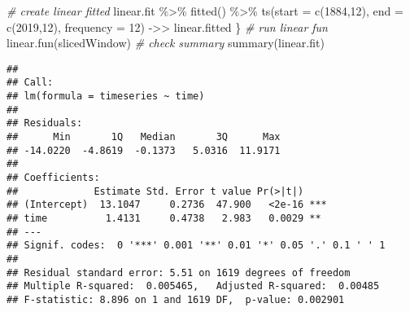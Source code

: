 \documentclass[
]{article}
\newenvironment{Shaded}{\begin{snugshade}}{\end{snugshade}}
\newcommand{\AttributeTok}[1]{\textcolor[rgb]{0.77,0.63,0.00}{#1}}
\newcommand{\CommentTok}[1]{\textcolor[rgb]{0.56,0.35,0.01}{\textit{#1}}}
\newcommand{\DecValTok}[1]{\textcolor[rgb]{0.00,0.00,0.81}{#1}}
\newcommand{\FunctionTok}[1]{\textcolor[rgb]{0.00,0.00,0.00}{#1}}
\newcommand{\NormalTok}[1]{#1}
\newcommand{\OtherTok}[1]{\textcolor[rgb]{0.56,0.35,0.01}{#1}}
\newcommand{\SpecialCharTok}[1]{\textcolor[rgb]{0.00,0.00,0.00}{#1}}
\begin{document}
\begin{Shaded}
\begin{Highlighting}[]
    \CommentTok{\# create linear fitted}
\NormalTok{  linear.fit }\SpecialCharTok{\%\textgreater{}\%} \FunctionTok{fitted}\NormalTok{() }\SpecialCharTok{\%\textgreater{}\%} \FunctionTok{ts}\NormalTok{(}\AttributeTok{start =} \FunctionTok{c}\NormalTok{(}\DecValTok{1884}\NormalTok{,}\DecValTok{12}\NormalTok{), }\AttributeTok{end =} \FunctionTok{c}\NormalTok{(}\DecValTok{2019}\NormalTok{,}\DecValTok{12}\NormalTok{), }\AttributeTok{frequency =} \DecValTok{12}\NormalTok{) }\OtherTok{{-}\textgreater{}\textgreater{}}\NormalTok{ linear.fitted}
\NormalTok{\}}
\CommentTok{\# run linear fun}
\FunctionTok{linear.fun}\NormalTok{(slicedWindow)}
\CommentTok{\# check summary}
\FunctionTok{summary}\NormalTok{(linear.fit)}
\end{Highlighting}
\end{Shaded}

\begin{verbatim}
## 
## Call:
## lm(formula = timeseries ~ time)
## 
## Residuals:
##      Min       1Q   Median       3Q      Max 
## -14.0220  -4.8619  -0.1373   5.0316  11.9171 
## 
## Coefficients:
##             Estimate Std. Error t value Pr(>|t|)    
## (Intercept)  13.1047     0.2736  47.900   <2e-16 ***
## time          1.4131     0.4738   2.983   0.0029 ** 
## ---
## Signif. codes:  0 '***' 0.001 '**' 0.01 '*' 0.05 '.' 0.1 ' ' 1
## 
## Residual standard error: 5.51 on 1619 degrees of freedom
## Multiple R-squared:  0.005465,   Adjusted R-squared:  0.00485 
## F-statistic: 8.896 on 1 and 1619 DF,  p-value: 0.002901
\end{verbatim}
\end{document}
